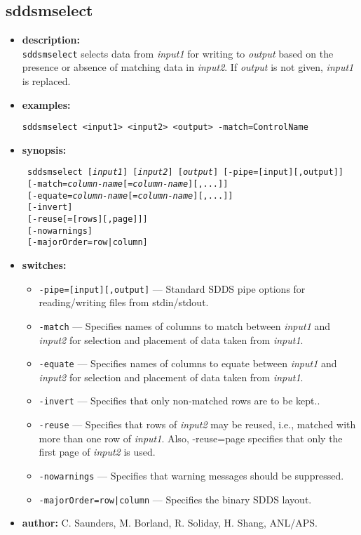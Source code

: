\newpage 
\subsection{sddsmselect} 
\label{sddsmselect} 
 
\begin{itemize} 
\item {\bf description:} \hspace*{1mm}\\ 
{\tt sddsmselect} selects data from {\em input1} for writing to {\em output} based on the presence or absence of matching data in {\em input2}. If {\em output} is not given, {\em input1} is replaced.
\item {\bf examples:} 
\begin{flushleft}
{\tt sddsmselect <input1> <input2> <output> -match=ControlName }
\end{flushleft} 
\item {\bf synopsis:}  
\begin{flushleft}
{\tt 
sddsmselect [{\em input1}] [{\em input2}] [{\em output}] [-pipe=[input][,output]] \\ \
[-match={\em column-name}[={\em column-name}][,...]] \\ \
[-equate={\em column-name}[={\em column-name}][,...]] \\ \
[-invert] \\ \
[-reuse[=[rows][,page]]] \\ \
[-nowarnings] \\ \
[-majorOrder=row|column]}
\end{flushleft} 
\item {\bf switches:} 
    \begin{itemize} 
    \item {\tt -pipe=[input][,output]} --- Standard SDDS pipe options for reading/writing files from stdin/stdout.
    \item {\tt -match} --- Specifies names of columns to match between {\em input1} and {\em input2} for selection and placement of data taken from {\em input1}.
    \item {\tt -equate} --- Specifies names of columns to equate between {\em input1} and {\em input2} for selection and placement of data taken from {\em input1}.
    \item {\tt -invert} --- Specifies that only non-matched rows are to be kept..
    \item {\tt -reuse} --- Specifies that rows of {\em input2} may be reused, i.e., matched with more than one row of {\em input1}.  Also, -reuse=page specifies that only the first page of {\em input2} is used.
    \item {\tt -nowarnings} --- Specifies that warning messages should be suppressed.
    \item {\tt -majorOrder=row|column} --- Specifies the binary SDDS layout.
\end{itemize} 

\item {\bf author:} C. Saunders, M. Borland, R. Soliday, H. Shang, ANL/APS. 
\end{itemize} 
